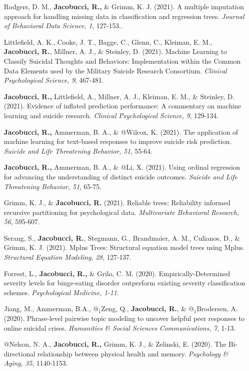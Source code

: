 \documentclass[letterpaper,10pt]{article}
\begin{document}
\begin{etaremune}
		\item Rodgers, D. M., \textbf{Jacobucci, R.,} \& Grimm, K. J. (2021). A multiple imputation approach for handling missing data in classification and regression trees. \emph{Journal of Behavioral Data Science, 1}, 127-153..
	\item Littlefield, A. K., Cooke, J. T., Bagge, C., Glenn, C., Kleiman, E. M., \textbf{Jacobucci, R.}, Millner, A. J., \& Steinley, D. (2021). Machine Learning to Classify Suicidal Thoughts and Behaviors: Implementation within the Common Data Elements used by the Military Suicide Research Consortium. \emph{Clinical Psychological Science, 9}, 467-481.
	\item \textbf{Jacobucci, R.,} Littlefield, A., Millner, A. J., Kleiman, E. M., \& Steinley, D. (2021). Evidence of inflated prediction performance: A commentary on machine learning and suicide research. \emph{Clinical Psychological Science, 9}, 129-134.
	\item \textbf{Jacobucci, R.,} Ammerman, B. A., \& $@$Wilcox, K. (2021). The application of machine learning for text-based responses to improve suicide risk prediction. \emph{Suicide and Life Threatening Behavior, 51}, 55-64.
	\item \textbf{Jacobucci, R.,} Ammerman, B. A., \& $@$Li, X. (2021). Using ordinal regression for advancing the understanding of distinct suicide outcomes. \emph{Suicide and Life Threatening Behavior, 51}, 65-75.
	\item Grimm, K. J., \& \textbf{Jacobucci, R.} (2021). Reliable trees: Reliability informed recursive partitioning for psychological data. \emph{Multivariate Behavioral Research, 56,} 595-607.
	\item  Serang, S., \textbf{Jacobucci, R.}, Stegmann, G., Brandmaier, A. M., Culianos, D., \& Grimm, K. J. (2021). Mplus Trees: Structural equation model trees using Mplus. \emph{Structural Equation Modeling, 28}, 127-137.
		\item Forrest, L., \textbf{Jacobucci, R.,} \& Grilo, C. M. (2020). Empirically-Determined severity levels for binge-eating disorder outperform existing severity classification schemes. \emph{Psychological Medicine, 1-11}.
		\item Jiang, M., Ammerman, B.A., $@_1$Zeng, Q., \textbf{Jacobucci, R.}, \& $@_1$Brodersen, A. (2020). Phrase-level pairwise topic modeling to uncover helpful peer responses to online suicidal crises. \emph{Humanities \& Social Sciences Communications, 7}, 1-13.
	\item $@$Nelson, N. A., \textbf{Jacobucci, R.,} Grimm, K. J., \& Zelinski, E. (2020). The Bi-directional relationship between physical health and memory. \emph{Psychology \& Aging, 35}, 1140-1153.

\end{etaremune}
\end{document}
